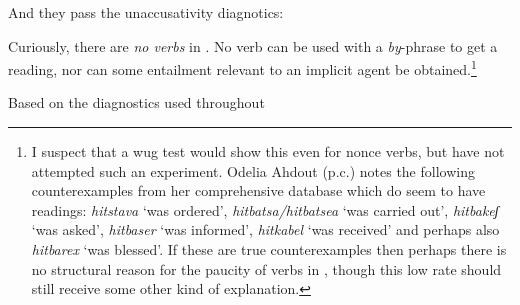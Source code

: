 \begin{exe}
\begin{xlist}
\begin{xlist}
\begin{exe}
\begin{xlist}
\begin{xlist}
\begin{exe}
\begin{xlist}
\begin{xlist}
\begin{exe}
\begin{exe}
\begin{xlist}
\begin{exe}
\begin{exe}
\begin{xlist}
\begin{exe}
\begin{exe}
\begin{exe}
\begin{exe}
\begin{exe}
\begin{xlist}
\begin{exe}
\begin{xlist}
\begin{exe}
\begin{exe}
\begin{xlist}
\begin{exe}
\begin{xlist}
\begin{exe}
\begin{xlist}
\begin{exe}
\begin{exe}
\begin{exe}
\begin{xlist}
\begin{exe}
\begin{exe}
\begin{exe}
\begin{xlist}
\begin{exe}
\begin{xlist}
\begin{exe}
\begin{exe}
\begin{xlist}
\begin{exe}
\begin{exe}
\begin{exe}
\begin{exe}
\begin{xlist}
\begin{exe}
\begin{xlist}
\begin{exe}
\begin{xlist}
\begin{exe}
\begin{xlist}
\begin{exe}
\begin{xlist}
\begin{exe}
\begin{xlist}
\begin{exe}
\begin{exe}
\begin{xlist}
\begin{exe}
\begin{xlist}
\begin{exe}
\begin{exe}
\begin{xlist}
\begin{exe}
\begin{xlist}
\begin{exe}
\begin{exe}
\begin{exe}
\begin{exe}
\begin{xlist}
\begin{xlist}
\begin{exe}
\begin{xlist}
 \z
\z 

And they pass the unaccusativity diagnotics:
 \begin{exe}
	
	
 \z 

Curiously, there are \textit{no  verbs} in {\thit}. No verb can be used with a \emph{by}-phrase to get a  reading, nor can some entailment relevant to an implicit agent be obtained.\footnote{I suspect that a wug test would show this even for nonce verbs, but have not attempted such an experiment. Odelia Ahdout (p.c.) notes the following counterexamples from her comprehensive database which do seem to have  readings: \emph{hitstava} `was ordered', \emph{hitbatsa/hitbatsea} `was carried out', \emph{hitbakeʃ} `was asked', \emph{hitbaser} `was informed', \emph{hitkabel} `was received' and perhaps also \emph{hitbarex} `was blessed'. If these are true counterexamples then perhaps there is no structural reason for the paucity of  verbs in {\thit}, though this low rate should still receive some other kind of explanation.}
 \begin{exe}
	
 \z 

Based on the diagnostics used throughout 
\end{exe}
\end{exe}
\end{xlist}
\end{exe}
\end{xlist}
\end{xlist}
\end{exe}
\end{exe}
\end{exe}
\end{exe}
\end{xlist}
\end{exe}
\end{xlist}
\end{exe}
\end{exe}
\end{xlist}
\end{exe}
\end{xlist}
\end{exe}
\end{exe}
\end{xlist}
\end{exe}
\end{xlist}
\end{exe}
\end{xlist}
\end{exe}
\end{xlist}
\end{exe}
\end{xlist}
\end{exe}
\end{xlist}
\end{exe}
\end{exe}
\end{exe}
\end{exe}
\end{xlist}
\end{exe}
\end{exe}
\end{xlist}
\end{exe}
\end{xlist}
\end{exe}
\end{exe}
\end{exe}
\end{xlist}
\end{exe}
\end{exe}
\end{exe}
\end{xlist}
\end{exe}
\end{xlist}
\end{exe}
\end{xlist}
\end{exe}
\end{exe}
\end{xlist}
\end{exe}
\end{xlist}
\end{exe}
\end{exe}
\end{exe}
\end{exe}
\end{exe}
\end{xlist}
\end{exe}
\end{exe}
\end{xlist}
\end{exe}
\end{exe}
\end{xlist}
\end{xlist}
\end{exe}
\end{xlist}
\end{xlist}
\end{exe}
\end{xlist}
\end{xlist}
\end{exe}
